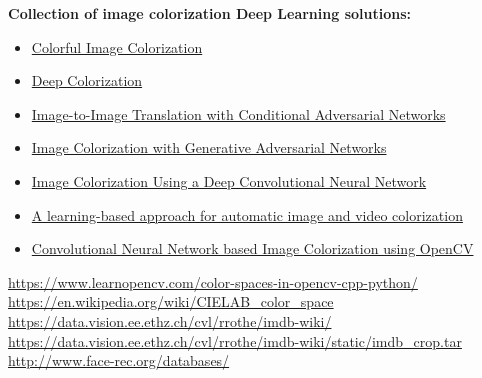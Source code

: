 \documentclass[12pt]{article}
\begin{document}
\begin{Large}
\textbf{Collection of image colorization Deep Learning solutions:}
\end{Large}
\begin{itemize}
	\setlength\itemsep{0em}
	\renewcommand\labelitemi{--}
	\item \href{https://arxiv.org/abs/1603.08511}{Colorful Image Colorization}
	\item \href{https://arxiv.org/abs/1605.00075}{Deep Colorization}
	\item \href{https://arxiv.org/abs/1611.07004}{Image-to-Image Translation with Conditional Adversarial Networks}
	\item \href{https://arxiv.org/abs/1803.05400}{Image Colorization with Generative Adversarial Networks}
	\item \href{https://arxiv.org/abs/1604.07904}{Image Colorization Using a Deep Convolutional Neural Network}
	\item \href{https://arxiv.org/abs/1704.04610}{A learning-based approach for automatic image and video colorization}
	\item \href{https://www.learnopencv.com/convolutional-neural-network-based-image-colorization-using-opencv/}{Convolutional Neural Network based Image Colorization using OpenCV}
\end{itemize}
\begin{thebibliography}{sort}
	\url{https://www.learnopencv.com/color-spaces-in-opencv-cpp-python/}
	\url{https://en.wikipedia.org/wiki/CIELAB_color_space}
	\url{https://data.vision.ee.ethz.ch/cvl/rrothe/imdb-wiki/}
	\url{https://data.vision.ee.ethz.ch/cvl/rrothe/imdb-wiki/static/imdb_crop.tar}
	\url{http://www.face-rec.org/databases/}
	
\end{thebibliography}
\end{document}
